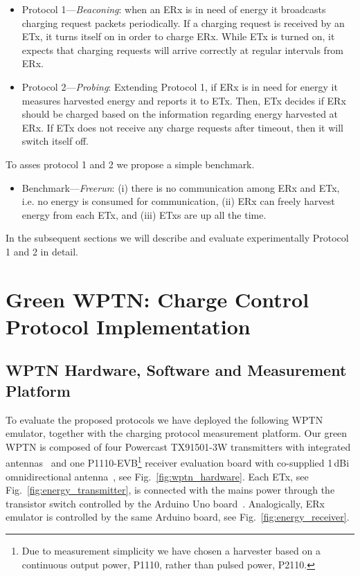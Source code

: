 \documentclass[11pt,draftclsnofoot,journal,onecolumn]{IEEEtran}
\begin{document}
\begin{itemize}
\item Protocol 1---\emph{Beaconing}: when an ERx is in need of energy it broadcasts charging request packets periodically. If a charging request is received by an ETx, it turns itself on in order to charge ERx. While ETx is turned on, it expects that charging requests will arrive correctly at regular intervals from ERx.

\item Protocol 2---\emph{Probing}: Extending Protocol 1, if ERx is in need for energy it measures harvested energy and reports it to ETx. Then, ETx decides if ERx should be charged based on the information regarding energy harvested at ERx. If ETx does not receive any charge requests after timeout, then it will switch itself off.
\end{itemize}

To asses protocol 1 and 2 we propose a simple benchmark.

\begin{itemize}
\item Benchmark---\emph{Freerun}: (i) there is no communication among ERx and ETx, i.e. no energy is consumed for communication, (ii) ERx can freely harvest energy from each ETx, and (iii) ETxs are up all the time.
\end{itemize}
In the subsequent sections we will describe and evaluate experimentally Protocol 1 and 2 in detail.

\section{Green WPTN: Charge Control Protocol Implementation}
\label{sec:experimental_verification}

\subsection{WPTN Hardware, Software and Measurement Platform}
\label{sec:wptn_network_hardware}

To evaluate the proposed protocols we have deployed the following WPTN emulator, together with the charging protocol measurement platform. Our green WPTN is composed of four Powercast TX91501-3W transmitters with integrated antennas~\cite[/products/powercaster-transmitters]{powercast_website} and one P1110-EVB\footnote{Due to measurement simplicity we have chosen a harvester based on a continuous output power, P1110, rather than pulsed power, P2110.} receiver evaluation board with co-supplied 1\,dBi omnidirectional antenna~\cite[/products/development-kits]{powercast_website}, see Fig.~\ref{fig:wptn_hardware}. Each ETx, see Fig.~\ref{fig:energy_transmitter}, is connected with the mains power through the transistor switch controlled by the Arduino Uno board~\cite[/arduinoBoardUno]{arduino_website}. Analogically, ERx emulator is controlled by the same Arduino board, see Fig.~\ref{fig:energy_receiver}. 
\end{document}
